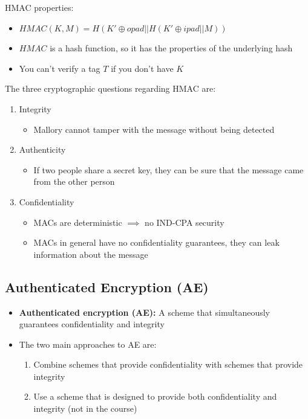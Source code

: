 \documentclass[12pt,a4paper]{article}
\begin{document}
\noindent HMAC properties:
\begin{itemize}
    \item $HMAC(K,M) = H(K' \oplus opad || H(K' \oplus ipad || M))$
    \item $HMAC$ is a hash function, so it has the properties of the underlying hash 
    \item You can't verify a tag $T$ if you don't have $K$
\end{itemize}

The three cryptographic questions regarding HMAC are:
\begin{enumerate}
    \item Integrity
    \begin{itemize}
        \item Mallory cannot tamper with the message without being detected
    \end{itemize}
    \item Authenticity
    \begin{itemize}
        \item If two people share a secret key, they can be sure that the message came from the other person
    \end{itemize}
    \item Confidentiality
    \begin{itemize}
        \item MACs are deterministic $\implies$ no IND-CPA security 
        \item MACs in general have no confidentiality guarantees, they can leak information about the message
    \end{itemize}
\end{enumerate}

\subsection{Authenticated Encryption (AE)}
\begin{itemize}
    \item \textbf{Authenticated encryption (AE):} A scheme that simultaneously guarantees confidentiality and integrity
    \item The two main approaches to AE are:
    \begin{enumerate}
        \item Combine schemes that provide confidentiality with schemes that provide integrity
        \item Use a scheme that is designed to provide both confidentiality and integrity (not in the course)
    \end{enumerate}
\end{itemize}
\end{document}
